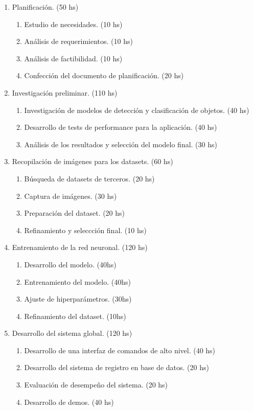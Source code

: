 \documentclass[
11pt %
]{charter}
\begin{document}
\begin{enumerate}
\item Planificación. (50 hs)
	\begin{enumerate}
	\item Estudio de necesidades. (10 hs)
	\item Análisis de requerimientos. (10 hs)
	\item Análisis de factibilidad. (10 hs)
	\item Confección del documento de planificación. (20 hs)
	\end{enumerate}
	
\item Investigación preliminar. (110 hs)
	\begin{enumerate}
	\item Investigación de modelos de detección y clasificación de objetos. (40 hs)
	\item Desarrollo de tests de performance para la aplicación. (40 hs)
	\item Análisis de los resultados y selección del modelo final. (30 hs)
	\end{enumerate}
	
\item Recopilación de imágenes para los datasets. (60 hs)
	\begin{enumerate}
	\item Búsqueda de datasets de terceros. (20 hs)
	\item Captura de imágenes. (30 hs)
	\item Preparación del dataset. (20 hs)
	\item Refinamiento y seleccción final. (10 hs)
	\end{enumerate}

\item Entrenamiento de la red neuronal. (120 hs)
	\begin{enumerate}
	\item Desarrollo del modelo. (40hs)
	\item Entrenamiento del modelo. (40hs)
	\item Ajuste de hiperparámetros. (30hs)
	\item Refinamiento del dataset. (10hs)
	\end{enumerate}
	
\item Desarrollo del sistema global. (120 hs)
	\begin{enumerate}
	\item Desarrollo de una interfaz de comandos de alto nivel. (40 hs)
	\item Desarrollo del sistema de registro en base de datos. (20 hs)
	\item Evaluación de desempeño del sistema. (20 hs)
	\item Desarrollo de demos. (40 hs)
	\end{enumerate}
	

\end{enumerate}
\end{document}
